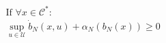 \documentclass[preview]{standalone}
\begin{document}
\begin{align*}
&\text{If }\forall x \in \mathcal{C}^*:\\ &\sup_{u \in \mathcal{U}} \dot b_N(x, u) + \alpha_N(b_N(x)) \geq 0
\end{align*}
\end{document}
